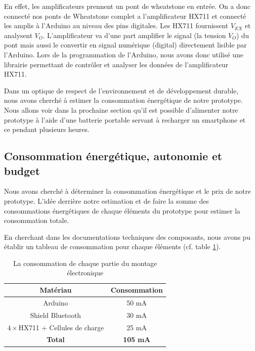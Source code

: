 \documentclass{polytech/polytech}
\begin{document}
 En effet, les amplificateurs prennent un pont de wheatstone en entrée. On a donc connecté nos ponts de Wheatstone complet a l'amplificateur HX711 et connecté les amplis à l'Arduino au niveau des pins digitales. Les HX711 fournissent $V_{EX}$ et analysent $V_O$. L'amplificateur va d'une part amplifier le signal (la tension $V_O$) du pont mais aussi le convertir en signal numérique (digital) directement lisible par l'Arduino. Lors de la programmation de l'Arduino, nous avons donc utilisé une librairie permettant de contrôler et analyser les données de l'amplificateur HX711.
 
 Dans un optique de respect de l'environnement et de développement durable, nous avons cherché à estimer la consommation énergétique de notre prototype. Nous allons voir dans la prochaine section qu'il est possible d'alimenter notre prototype à l'aide d'une batterie portable servant à recharger un smartphone et ce pendant plusieurs heures.

\subsection{Consommation énergétique, autonomie et budget}

Nous avons cherché à déterminer la consommation énergétique et le prix de notre prototype.
L'idée derrière notre estimation et de faire la somme des consommations énergétiques de chaque éléments du prototype pour estimer la consommation totale.

En cherchant dans les documentations techniques des composants, nous avons pu établir un tableau de consommation pour chaque éléments (cf. table \ref{tab:consommation}).

\begin{table}
\begin{center}
\begin{tabular}{| c | c |}
\hline
\textbf{Matériau} & \textbf{Consommation} \\\hline\hline
Arduino & 50 mA \\\hline
Shield Bluetooth & 30 mA \\\hline
$4 \times$HX711 + Cellules de charge & 25 mA \\\hline
\textbf{Total} &  \textbf{105 mA} \\\hline
\end{tabular}
\end{center}
\caption{La consommation de chaque partie du montage électronique}
\label{tab:consommation}
\end{table}
\end{document}
